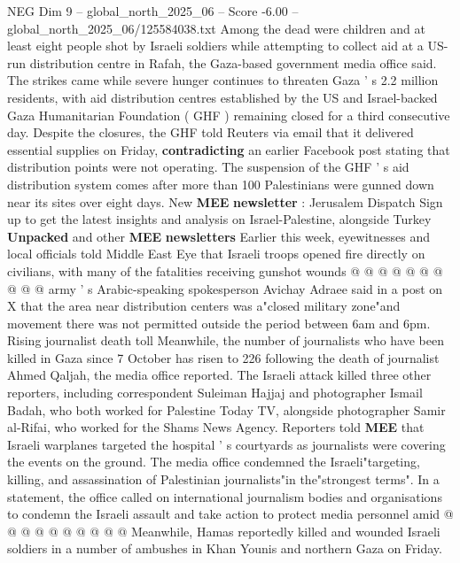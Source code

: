 \begin{textsample}{NEG Dim 9 – global\_north\_2025\_06 – Score -6.00 – global\_north\_2025\_06/125584038.txt}  \label{ex:f9_neg_078}
Among the dead were children and at least eight people shot by Israeli soldiers while attempting to collect aid at a US-run distribution centre in Rafah, the Gaza-based government media office said.
The strikes came while severe hunger continues to threaten Gaza ' s 2.2 million residents, with aid distribution centres established by the US and Israel-backed Gaza Humanitarian Foundation ( GHF ) remaining closed for a third consecutive day.
Despite the closures, the GHF told Reuters via email that it delivered essential supplies on Friday, \textbf{contradicting} an earlier Facebook post stating that distribution points were not operating.
The suspension of the GHF ' s aid distribution system comes after more than 100 Palestinians were gunned down near its sites over eight days.
New \textbf{MEE} \textbf{newsletter} : Jerusalem Dispatch Sign up to get the latest insights and analysis on Israel-Palestine, alongside Turkey \textbf{Unpacked} and other \textbf{MEE} \textbf{newsletters} Earlier this week, eyewitnesses and local officials told Middle East Eye that Israeli troops opened fire directly on civilians, with many of the fatalities receiving gunshot wounds @ @ @ @ @ @ @ @ @ @ army ' s Arabic-speaking spokesperson Avichay Adraee said in a post on X that the area near distribution centers was a"closed military zone"and movement there was not permitted outside the period between 6am and 6pm.
Rising journalist death toll Meanwhile, the number of journalists who have been killed in Gaza since 7 October has risen to 226 following the death of journalist Ahmed Qaljah, the media office reported.
The Israeli attack killed three other reporters, including correspondent Suleiman Hajjaj and photographer Ismail Badah, who both worked for Palestine Today TV, alongside photographer Samir al-Rifai, who worked for the Shams News Agency.
Reporters told \textbf{MEE} that Israeli warplanes targeted the hospital ' s courtyards as journalists were covering the events on the ground.
The media office condemned the Israeli"targeting, killing, and assassination of Palestinian journalists"in the"strongest terms".
In a statement, the office called on international journalism bodies and organisations to condemn the Israeli assault and take action to protect media personnel amid @ @ @ @ @ @ @ @ @ @ Meanwhile, Hamas reportedly killed and wounded Israeli soldiers in a number of ambushes in Khan Younis and northern Gaza on Friday.

\end{textsample}
